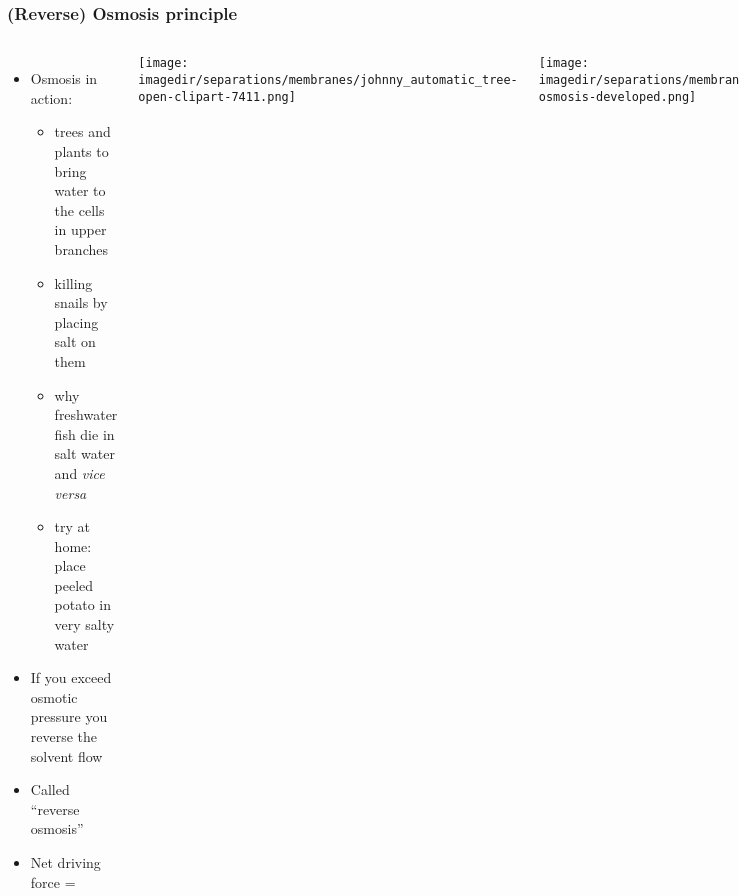 \begin{frame}\frametitle{(Reverse) Osmosis principle}
	\begin{columns}[t]
			\begin{itemize}
				\item	Osmosis in action:
				\begin{itemize}
					\item	trees and plants to bring water to the cells in upper branches
					\item	killing snails by placing salt on them
					\item	why freshwater fish die in salt water and \emph{vice versa}
					\item	try at home: place peeled potato in very salty water
				\end{itemize}
				\item	If you exceed osmotic pressure you reverse the solvent flow
				\item	Called ``reverse osmosis''
				\item	Net driving force = \underline{$\qquad\qquad\qquad$}
			\end{itemize}
			\vspace{-1cm}
			\begin{center}
				\texttt{[image: \\imagedir/separations/membranes/johnny\_automatic\_tree-open-clipart-7411.png]}
			\end{center}
			\begin{center}
				\texttt{[image: \\imagedir/separations/membranes/reverse-osmosis-developed.png]}
			\end{center}
	\end{columns}
\end{frame}

